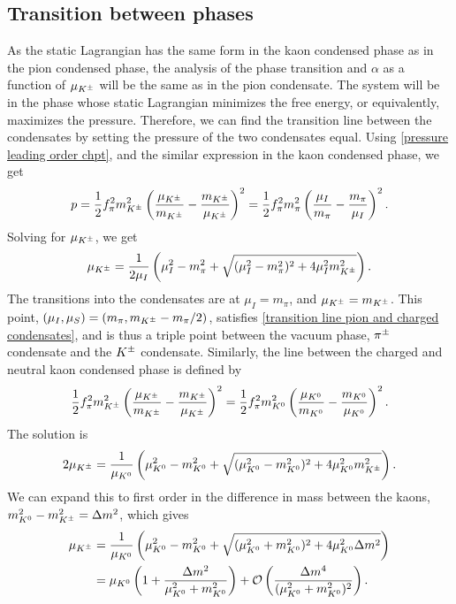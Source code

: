 \subsection{Transition between phases}


As the static Lagrangian has the same form in the kaon condensed phase as in the pion condensed phase, the analysis of the phase transition and $\alpha$ as a function of $\mu_{K^\pm}$ will be the same as in the pion condensate.
The system will be in the phase whose static Lagrangian minimizes the free energy, or equivalently, maximizes the pressure.
Therefore, we can find the transition line between the condensates by setting the pressure of the two condensates equal.
Using \autoref{pressure leading order chpt}, and the similar expression in the kaon condensed phase, we get
%
\begin{equation}
    p 
    = \frac{1}{2} f_\pi^2 m_{K^\pm}^2 \left( \frac{\mu_{K^\pm}}{m_{K^\pm}} - \frac{m_{K^\pm}}{\mu_{K^\pm}} \right)^2
    =
    \frac{1}{2} f_\pi^2m_\pi^2  \left( \frac{\mu_I}{m_\pi} - \frac{m_\pi}{\mu_I} \right)^2.
\end{equation}
%
Solving for $\mu_{K^\pm}$, we get
%
\begin{equation}
    \label{transition line pion and charged condensates}
    \mu_{K^\pm} =\frac{1}{2\mu_I} \left(\mu_I^2 - m_\pi^2  + \sqrt{(\mu_I^2 - m_\pi^2)^2 + 4\mu_I^2 m_{K^\pm}^2}\right).
\end{equation}
%
The transitions into the condensates are at $\mu_I = m_\pi$, and $\mu_{K^\pm} = m_{K^\pm}$.
This point, $(\mu_I, \mu_S) = (m_\pi, m_{K^\pm} - m_\pi/2)$, satisfies \autoref{transition line pion and charged condensates}, and is thus a triple point between the vacuum phase, ${\pi^\pm}$ condensate and the ${K^\pm}$ condensate. 
Similarly, the line between the charged and neutral kaon condensed phase is defined by
%
\begin{equation}
    \frac{1}{2} f_\pi^2 m_{K^\pm}^2 \left( \frac{\mu_{K^\pm}}{m_{K^\pm}} - \frac{m_{K^\pm}}{\mu_{K^\pm}} \right)^2
    =
    \frac{1}{2} f_\pi^2 m_{K^0}^2 \left( \frac{\mu_{K^0}}{m_{K^0}} - \frac{m_{K^0}}{\mu_{K^0}} \right)^2.
\end{equation}
%
The solution is
%
\begin{equation}
    2 \mu_{K^\pm} 
    = \frac{1}{\mu_{K^0}}
    \left(
        \mu_{K^0}^2 - m_{K^0}^2  + \sqrt{(\mu_{K^0}^2 - m_{K^0}^2)^2 + 4\mu_{K^0}^2m_{K^\pm}^2}
    \right).
\end{equation}
%
We can expand this to first order in the difference in mass between the kaons, $m_{K^0}^2 - m_{K^\pm}^2 = \Delta m^2$, which gives
%
\begin{align}
    \nonumber
    \mu_{K^\pm}
    &= \frac{1}{\mu_{K^0}} 
    \left(
        \mu_{K^0}^2 - m_{K^0}^2 + \sqrt{(\mu_{K^0}^2 + m_{K^0}^2)^2 + 4\mu_{K^0}^2 \Delta m^2}
    \right)\\
    &= \mu_{K^0} \left(1 + \frac{\Delta m^2}{\mu_{K^0}^2 + m_{K^0}^2}\right)
    + \mathcal O\left( \frac{\Delta m^4}{ (\mu_{K^0}^2 + m_{K^0}^2)^2} \right).
\end{align}
